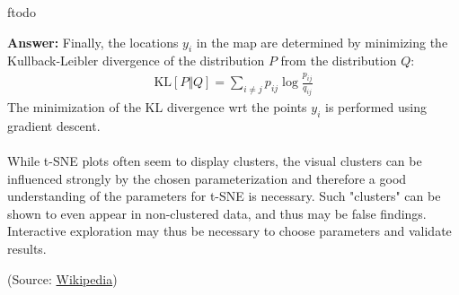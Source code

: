 ƒtodo\documentclass{article}
\newenvironment{QandA}{\begin{enumerate}[label=\arabic*.]}{\end{enumerate}}
\newenvironment{answer}{\par\normalfont \textbf{Answer:}}{}
\newcommand{\KL}[2]{\text{KL}\left[#1 \Vert #2 \right]}
\begin{document}
\begin{QandA}
\begin{answer}
    Finally, the locations $y_i$ in the map are determined by minimizing the Kullback-Leibler divergence of the distribution $P$ from the distribution $Q$:
    \begin{align*}
        \KL{P}{Q} = \sum_{i \neq j} p_{ij} \log \frac{p_{ij}}{q_{ij}}
    \end{align*}
    The minimization of the KL divergence wrt the points $y_i$ is performed using gradient descent.  \\\\
    While t-SNE plots often seem to display clusters, the visual clusters can be influenced strongly by the chosen parameterization and therefore a good understanding of the parameters for t-SNE is necessary. Such "clusters" can be shown to even appear in non-clustered data, and thus may be false findings. Interactive exploration may thus be necessary to choose parameters and validate results. 
    
    (Source: \href{https://en.wikipedia.org/wiki/T-distributed_stochastic_neighbor_embedding}{Wikipedia})
    \end{answer}
\end{QandA}
\end{document}
